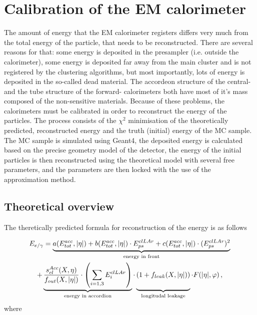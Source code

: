 \chapter{Calibration of the EM calorimeter}
\label{sec:Calibration}

The amount of energy that the EM calorimeter registers differs very much from the total energy of the particle, that needs to be reconstructed. There are several reasons for that: some energy is deposited in the presampler (i.e. outside the calorimeter), some energy is deposited far away from the main cluster and is not registered by the clustering algorithms, but most importantly, lots of energy is deposited in the so-called dead material. The accordeon structure of the central- and the tube structure of the forward- calorimeters both have most of it's mass composed of the non-sensitive materials. Because of these problems, the calorimeters must be calibrated in order to reconstruct the energy of the particles. The process consists of the $\chi^{2}$ minimisation of the theoretically predicted, reconstructed energy and the truth (initial) energy of the MC sample. The MC sample is simulated using Geant4, the deposited energy is calculated based on the precise geometry model of the detector, the energy of the initial particles is then reconstructed using the theoretical model with several free parameters, and the parameters are then locked with the use of the approximation method.

\section{Theoretical overview}

The theretically predicted formula for reconstruction of the energy is as follows

\begin{equation}
\label{eq:calib_theory}
\begin{gathered}
E_{e/\gamma} = \underbrace{a(E^{acc}_{tot}, |\eta|) + b (E^{acc}_{tot}, |\eta|) \cdot E^{clLAr}_{ps} + c (E^{acc}_{tot}, |\eta|) \cdot (E^{clLAr}_{ps})^{2}}_\text{energy in front} \\
+ \underbrace{\frac{s^{Acc}_{cl}(X,\eta)}{f_{out}(X,|\eta|)} \cdot \left( \sum\limits_{i=1,3} E^{clLAr}_{i} \right)}_\text{energy in accordion}
 \cdot \underbrace{(1+f_{leak}(X,|\eta|)) \vphantom{\left( \sum\limits_{i=1,3} E^{clLAr}_{i} \right)}}_\text{longitudal leakage}
 \cdot F(|\eta|,\varphi) \,,
\end{gathered}
\end{equation}
where

